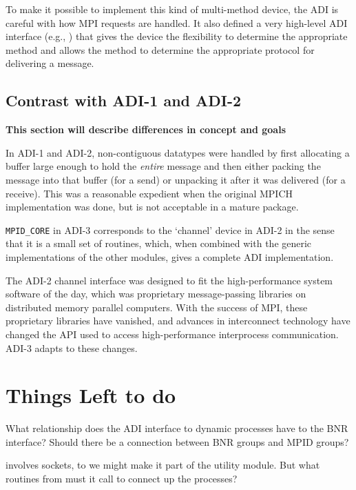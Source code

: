 \documentclass{article}
\begin{document}
To make it possible to implement this kind of multi-method device, the
ADI is careful with how MPI requests are handled.  It also defined a
very high-level ADI interface (e.g., ) that gives the
device the flexibility to determine the appropriate method and allows
the method to determine the appropriate protocol for delivering a message.

\subsection{Contrast with ADI-1 and ADI-2}
\label{sec-historical}
\textbf{This section will describe differences in concept and goals}

In ADI-1 and ADI-2, non-contiguous datatypes were handled by first
allocating a buffer large enough to hold the \emph{entire} message and
then either packing the message into that buffer (for a send) or
unpacking it after it was delivered (for a receive).  This was a
reasonable expedient when the original MPICH implementation was done,
but is not acceptable in a mature package.

\texttt{MPID_CORE} in ADI-3 corresponds to the `channel' device in ADI-2 in
the sense that it is a small set of routines, which, when combined with the
generic implementations of the other modules, gives a complete ADI
implementation.  

The ADI-2 channel interface was designed to fit the high-performance system
software of the day, which was proprietary message-passing libraries on
distributed memory parallel computers.  With the success of MPI, these
proprietary libraries have vanished, and advances in interconnect technology
have changed the API used to access high-performance interprocess
communication.  ADI-3 adapts to these changes.

\section{Things Left to do}
What relationship does the ADI interface to dynamic processes 
have to the BNR interface?  Should there be a connection between BNR groups
and MPID groups?


 involves sockets, to we might make it part of the
utility module.  But what routines from  must it call
to connect up the processes?


%
\end{document}
